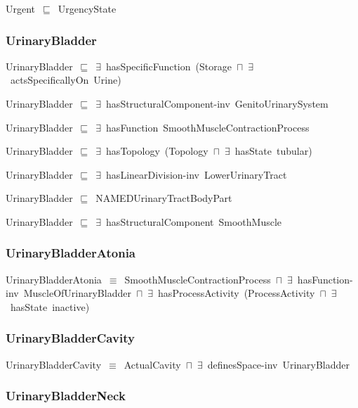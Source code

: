\documentclass{article}
\begin{document}
Urgent~\ensuremath{\sqsubseteq}~UrgencyState~

\subsubsection*{UrinaryBladder}

UrinaryBladder~\ensuremath{\sqsubseteq}~\ensuremath{\exists}~hasSpecificFunction~(Storage~\ensuremath{\sqcap}~\ensuremath{\exists}~actsSpecificallyOn~Urine)~

UrinaryBladder~\ensuremath{\sqsubseteq}~\ensuremath{\exists}~hasStructuralComponent-inv~GenitoUrinarySystem~

UrinaryBladder~\ensuremath{\sqsubseteq}~\ensuremath{\exists}~hasFunction~SmoothMuscleContractionProcess~

UrinaryBladder~\ensuremath{\sqsubseteq}~\ensuremath{\exists}~hasTopology~(Topology~\ensuremath{\sqcap}~\ensuremath{\exists}~hasState~tubular)~

UrinaryBladder~\ensuremath{\sqsubseteq}~\ensuremath{\exists}~hasLinearDivision-inv~LowerUrinaryTract~

UrinaryBladder~\ensuremath{\sqsubseteq}~NAMEDUrinaryTractBodyPart~

UrinaryBladder~\ensuremath{\sqsubseteq}~\ensuremath{\exists}~hasStructuralComponent~SmoothMuscle~

\subsubsection*{UrinaryBladderAtonia}

UrinaryBladderAtonia~\ensuremath{\equiv}~SmoothMuscleContractionProcess~\ensuremath{\sqcap}~\ensuremath{\exists}~hasFunction-inv~MuscleOfUrinaryBladder~\ensuremath{\sqcap}~\ensuremath{\exists}~hasProcessActivity~(ProcessActivity~\ensuremath{\sqcap}~\ensuremath{\exists}~hasState~inactive)

\subsubsection*{UrinaryBladderCavity}

UrinaryBladderCavity~\ensuremath{\equiv}~ActualCavity~\ensuremath{\sqcap}~\ensuremath{\exists}~definesSpace-inv~UrinaryBladder

\subsubsection*{UrinaryBladderNeck}
\end{document}
